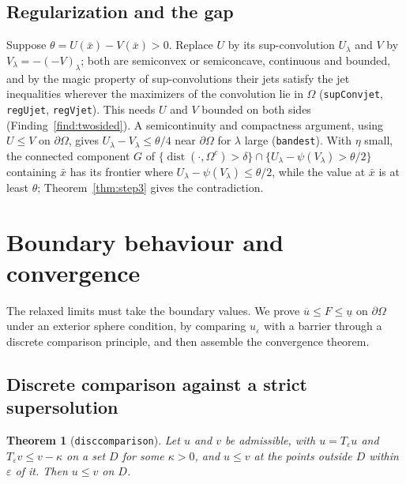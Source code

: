 \documentclass[11pt,reqno]{amsart}
\newcommand{\LEANREF}[1]{\texttt{\small\def\_{\textunderscore\allowbreak}#1}}
\newcommand{\eps}{\varepsilon}
\newcommand{\Op}{T_\eps}
\theoremstyle{plain}
\newtheorem{theorem}{Theorem}[section]
\theoremstyle{definition}
\begin{document}
\subsection{Regularization and the gap}\label{ssec:step4}

Suppose $\theta = U(\bar x) - V(\bar x) > 0$. Replace $U$ by its
sup-convolution $U_\lambda$ and $V$ by $V_\lambda = -(-V)_\lambda$; both are
semiconvex or semiconcave, continuous and bounded, and by the magic property of
sup-convolutions their jets satisfy the jet inequalities wherever the
maximizers of the convolution lie in $\Omega$
(\LEANREF{supConv\_jet}, \LEANREF{regU\_jet}, \LEANREF{regV\_jet}). This needs
$U$ and $V$ bounded on both sides (Finding~\ref{find:twosided}). A
semicontinuity and compactness argument, using $U \le V$ on $\partial\Omega$,
gives $U_\lambda - V_\lambda \le \theta/4$ near $\partial\Omega$ for $\lambda$
large (\LEANREF{band\_est}). With $\eta$ small, the connected component $G$ of
$\{\operatorname{dist}(\cdot, \Omega^c) > \delta\} \cap
\{U_\lambda - \psi(V_\lambda) > \theta/2\}$ containing $\bar x$ has its frontier
where $U_\lambda - \psi(V_\lambda) \le \theta/2$, while the value at $\bar x$ is
at least $\theta$; Theorem~\ref{thm:step3} gives the contradiction.

\section{Boundary behaviour and convergence}\label{sec:conv}

The relaxed limits must take the boundary values. We prove
$\overline u \le F \le \underline u$ on $\partial\Omega$ under an exterior sphere
condition, by comparing $u_\eps$ with a barrier through a discrete comparison
principle, and then assemble the convergence theorem.

\subsection{Discrete comparison against a strict supersolution}

\begin{theorem}[\LEANREF{disc\_comparison}]\label{thm:disccomp}
Let $u$ and $v$ be admissible, with $u = \Op u$ and $\Op v \le v - \kappa$ on a
set $D$ for some $\kappa > 0$, and $u \le v$ at the points outside $D$ within
$\eps$ of it. Then $u \le v$ on $D$.
\end{theorem}
\end{document}
